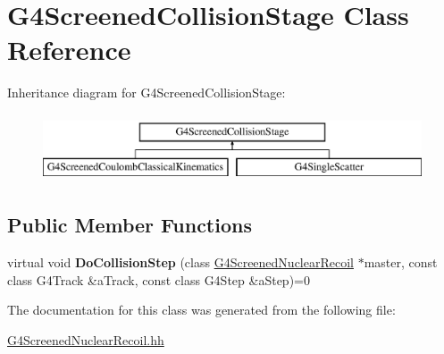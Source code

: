 \hypertarget{classG4ScreenedCollisionStage}{\section{G4\-Screened\-Collision\-Stage Class Reference}
\label{classG4ScreenedCollisionStage}
}
Inheritance diagram for G4\-Screened\-Collision\-Stage\-:\begin{figure}[H]
\begin{center}
\leavevmode
\includegraphics[height=2.000000cm]{classG4ScreenedCollisionStage}
\end{center}
\end{figure}
\subsection*{Public Member Functions}
\begin{DoxyCompactItemize}
\item 
\hypertarget{classG4ScreenedCollisionStage_aabba02b3b46ce6a425c4c7c70b88dbad}{virtual void {\bfseries Do\-Collision\-Step} (class \hyperlink{classG4ScreenedNuclearRecoil}{G4\-Screened\-Nuclear\-Recoil} $\ast$master, const class G4\-Track \&a\-Track, const class G4\-Step \&a\-Step)=0}\label{classG4ScreenedCollisionStage_aabba02b3b46ce6a425c4c7c70b88dbad}

\end{DoxyCompactItemize}


The documentation for this class was generated from the following file\-:\begin{DoxyCompactItemize}
\item 
\hyperlink{G4ScreenedNuclearRecoil_8hh}{G4\-Screened\-Nuclear\-Recoil.\-hh}\end{DoxyCompactItemize}
